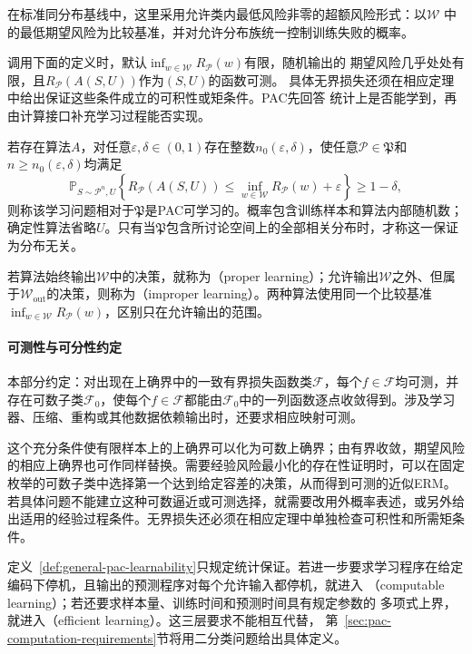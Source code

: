在标准同分布基线中，这里采用允许类内最低风险非零的超额风险形式：以$\mathcal W$
中的最低期望风险为比较基准，并对允许分布族统一控制训练失败的概率。

调用下面的定义时，默认$\inf_{w\in\mathcal W}R_{\mathcal P}(w)$有限，随机输出的
期望风险几乎处处有限，且$R_{\mathcal P}(A(S,U))$作为$(S,U)$的函数可测。
具体无界损失还须在相应定理中给出保证这些条件成立的可积性或矩条件。PAC先回答
统计上是否能学到，再由计算接口补充学习过程能否实现。

\begin{definition}[相对于分布族的PAC可学习性]
\label{def:general-pac-learnability}
若存在算法$A$，对任意$\varepsilon,\delta\in(0,1)$存在整数$n_0(\varepsilon,\delta)$，使任意$\mathcal P\in\mathfrak P$和$n\geq n_0(\varepsilon,\delta)$均满足
\[
 \mathbb P_{S\sim\mathcal P^n,U}\!\left\{
 R_{\mathcal P}(A(S,U))\leq
 \inf_{w\in\mathcal W}R_{\mathcal P}(w)+\varepsilon
 \right\}\geq1-\delta,
\]
则称该学习问题相对于$\mathfrak P$是PAC可学习的。概率包含训练样本和算法内部随机数；确定性算法省略$U$。只有当$\mathfrak P$包含所讨论空间上的全部相关分布时，才称这一保证为分布无关。
\end{definition}

若算法始终输出$\mathcal W$中的决策，就称为（proper learning）；允许输出$\mathcal W$之外、但属于$\mathcal W_{\mathrm{out}}$的决策，则称为（improper learning）。两种算法使用同一个比较基准$\inf_{w\in\mathcal W}R_{\mathcal P}(w)$，区别只在允许输出的范围。

\paragraph{可测性与可分性约定}

本部分约定：对出现在上确界中的一致有界损失函数类$\mathcal F$，每个$f\in\mathcal F$均可测，并存在可数子类$\mathcal F_0$，使每个$f\in\mathcal F$都能由$\mathcal F_0$中的一列函数逐点收敛得到。涉及学习器、压缩、重构或其他数据依赖输出时，还要求相应映射可测。

这个充分条件使有限样本上的上确界可以化为可数上确界；由有界收敛，期望风险的相应上确界也可作同样替换。需要经验风险最小化的存在性证明时，可以在固定枚举的可数子类中选择第一个达到给定容差的决策，从而得到可测的近似ERM。若具体问题不能建立这种可数逼近或可测选择，就需要改用外概率表述，或另外给出适用的经验过程条件。无界损失还必须在相应定理中单独检查可积性和所需矩条件。

定义~\ref{def:general-pac-learnability}只规定统计保证。若进一步要求学习程序在给定
编码下停机，且输出的预测程序对每个允许输入都停机，就进入
（computable learning）；若还要求样本量、训练时间和预测时间具有规定参数的
多项式上界，就进入（efficient learning）。这三层要求不能相互代替，
第~\ref{sec:pac-computation-requirements}节将用二分类问题给出具体定义。

